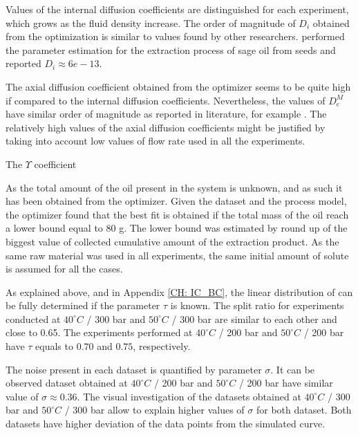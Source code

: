 \documentclass[../Article_Model_Parameters.tex]{subfiles}
\begin{document}
	Values of the internal diffusion coefficients are distinguished for each experiment, which grows as the fluid density increase. The order of magnitude of $D_i$ obtained from the optimization is similar to values found by other researchers. \citet{Reverchon1996} performed the parameter estimation for the extraction process of sage oil from seeds and reported $D_i \approx 6e-13$.
	
	The axial diffusion coefficient obtained from the optimizer seems to be quite high if compared to the internal diffusion coefficients. Nevertheless, the values of $D_e^M$ have similar order of magnitude as reported in literature, for example \citet{ReisVasco2000}. The relatively high values of the axial diffusion coefficients might be justified by taking into account low values of flow rate used in all the experiments.
	
	The $\Upsilon$ coefficient 
	
	As the total amount of the oil present in the system is unknown, and as such it has been obtained from the optimizer. Given the dataset and the process model, the optimizer found that the best fit is obtained if the total mass of the oil reach a lower bound equal to 80 g. The lower bound was estimated by round up of the biggest value of collected cumulative amount of the extraction product. As the same raw material was used in all experiments, the same initial amount of solute is assumed for all the cases.
	
	As explained above, and in Appendix \ref{CH: IC_BC}, the linear distribution of can be fully determined if the parameter $\tau$ is known. The split ratio for experiments conducted at $40 ^\circ C$ / 300 bar and $50 ^\circ C$ / 300 bar are similar to each other and close to 0.65. The experiments performed at $40 ^\circ C$ / 200 bar and $50 ^\circ C$ / 200 bar have $\tau$ equals to $0.70$ and $0.75$, respectively. 
	
	The noise present in each dataset is quantified by parameter $\sigma$. It can be observed dataset obtained at $40 ^\circ C$ / 200 bar and $50 ^\circ C$ / 200 bar have similar value of $\sigma\approx0.36$. The visual investigation of the datasets obtained at $40 ^\circ C$ / 300 bar and $50 ^\circ C$ / 300 bar allow to explain higher values of $\sigma$ for both dataset. Both datasets have higher deviation of the data points from the simulated curve.
	
\end{document}
